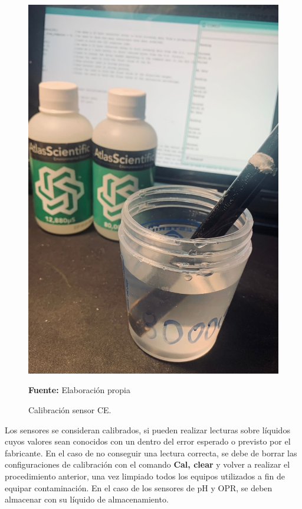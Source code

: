 \begin{figure}[H]
        \centering
        \includegraphics[scale=0.5]{Imagenes/cap4/calibracion.jpeg}
        \caption {Calibraci\'on sensor CE. }{\textbf{Fuente:}
        Elaboraci\'on propia}
        \label{fig:kit}
        
\end{figure}

Los sensores se consideran calibrados, si pueden realizar lecturas sobre l\'iquidos cuyos valores sean conocidos con un dentro del error esperado o previsto por el fabricante. 
En el caso de no conseguir una lectura correcta, se debe de borrar las configuraciones de calibraci\'on con el comando \textbf{Cal, clear} y volver a realizar el procedimiento anterior, una vez limpiado todos los equipos utilizados a fin de equipar contaminación. 
En el caso de los sensores de pH y OPR, se deben almacenar con su l\'iquido de almacenamiento.

